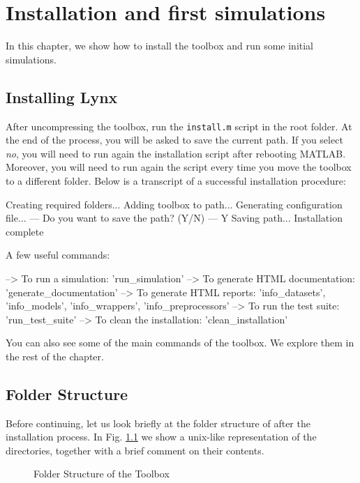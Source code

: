 \chapter{Installation and first simulations}
\label{chap:install}

In this chapter, we show how to install the toolbox and run some initial simulations.

\section{Installing Lynx}

After uncompressing the toolbox, run the \verb|install.m| script in the root folder. At the end of the process, you will be asked to save the current path. If you select \textit{no}, you will need to run again the installation script after rebooting MATLAB. Moreover, you will need to run again the script every time you move the toolbox to a different folder. Below is a transcript of a successful installation procedure:

\begin{console}
Creating required folders...
Adding toolbox to path...
Generating configuration file...
--- Do you want to save the path? (Y/N) ---
Y
Saving path...
Installation complete

A few useful commands:

   --> To run a simulation: 'run_simulation'
   --> To generate HTML documentation: 'generate_documentation'
   --> To generate HTML reports: 'info_datasets', 'info_models', 
      'info_wrappers', 'info_preprocessors'
   --> To run the test suite: 'run_test_suite'
   --> To clean the installation: 'clean_installation'
\end{console}

\noindent You can also see some of the main commands of the toolbox. We explore them in the rest of the chapter.

\section{Folder Structure}
\label{sec:folders}

Before continuing, let us look briefly at the folder structure of \toolboxname after the installation process. In Fig. \ref{fig:folders} we show a unix-like representation of the directories, together with a brief comment on their contents.

\begin{figure}[h]
\label{fig:folders}
\caption{Folder Structure of the Toolbox}
\end{figure} 

